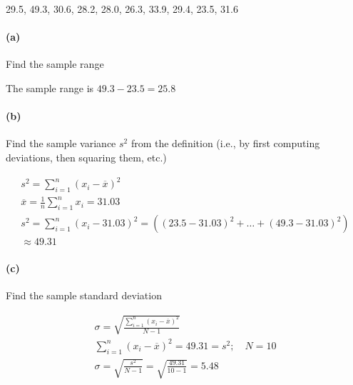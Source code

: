     29.5, 49.3, 30.6, 28.2, 28.0, 26.3, 33.9, 29.4, 23.5, 31.6

    \paragraph*{(a)}
    Find the sample range

    \begin{mdframed}
        The sample range is $49.3 - 23.5 = \boxed{25.8}$
    \end{mdframed}

    \paragraph*{(b)}
    Find the sample variance $s^2$ from the definition (i.e., by first computing deviations, then squaring them, etc.)

    \begin{mdframed}
        \begin{equation*}
            \begin{gathered}
                s^2 = \sum_{i=1}^{n}(x_{i}-\overline{x})^2 \\
                \overline{x} = \frac{1}{n}\sum_{i=1}^{n}x_i = 31.03 \\
                s^2 = \sum_{i=1}^{n}(x_{i}-31.03)^2 = ((23.5 - 31.03)^2 + \dots + (49.3 - 31.03)^2) \\
                \approx \boxed{49.31}
            \end{gathered}
        \end{equation*}
    \end{mdframed}

    \paragraph*{(c)}
    Find the sample standard deviation

    \begin{mdframed}
        \begin{equation*}
            \begin{gathered}
                \sigma = \sqrt{\frac{\sum_{i=1}^{n}(x_i-\overline{x})^2}{N-1}} \\
                \sum_{i=1}^{n}(x_i-\overline{x})^2 = 49.31 = s^2; \quad N = 10 \\
                \sigma = \sqrt{\frac{s^2}{N-1}} = \sqrt{\frac{49.31}{10-1}} = \boxed{5.48}
            \end{gathered}
        \end{equation*}
    \end{mdframed}

